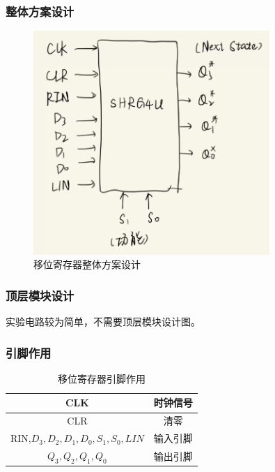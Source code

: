 \documentclass{article}
\begin{document}
    \subsubsection{整体方案设计}
    \begin{figure}[H]
    \centering
    \includegraphics[width=0.8\textwidth]{3.1.png}
    \caption{移位寄存器整体方案设计}
    \end{figure}

    \subsubsection{顶层模块设计}
    实验电路较为简单，不需要顶层模块设计图。

    \subsubsection{引脚作用}
    \begin{table}[H]
    \centering
    \begin{tabular}{|c|c|}
        \hline
        CLK & 时钟信号 \\ \hline
        CLR & 清零 \\ \hline
        RIN,$D_{3},D_{2},D_{1},D_{0},S_{1},S_{0},LIN$ & 输入引脚 \\ \hline
        $Q_{3},Q_{2},Q_{1},Q_{0}$ & 输出引脚 \\ \hline
    \end{tabular}
    \caption{移位寄存器引脚作用}
    \end{table}
\end{document}

